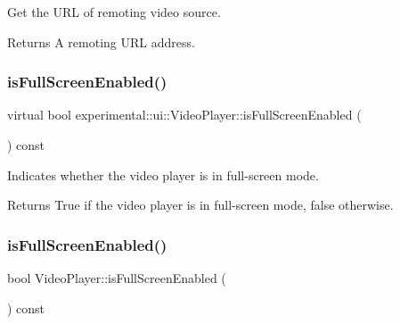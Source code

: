Get the U\+RL of remoting video source. 

\begin{DoxyReturn}{Returns}
A remoting U\+RL address. 
\end{DoxyReturn}
\mbox{\label{classexperimental_1_1ui_1_1VideoPlayer_a466c25180bccd97a4e96708c94f6d1aa}} 
\subsubsection{\texorpdfstring{is\+Full\+Screen\+Enabled()}{isFullScreenEnabled()}\hspace{0.1cm}{\footnotesize\ttfamily [1/2]}}
{\footnotesize\ttfamily virtual bool experimental\+::ui\+::\+Video\+Player\+::is\+Full\+Screen\+Enabled (\begin{DoxyParamCaption}{ }\end{DoxyParamCaption}) const\hspace{0.3cm}{\ttfamily [virtual]}}

Indicates whether the video player is in full-\/screen mode.

\begin{DoxyReturn}{Returns}
True if the video player is in full-\/screen mode, false otherwise. 
\end{DoxyReturn}
\mbox{\label{classexperimental_1_1ui_1_1VideoPlayer_ab2381455eeb422dc2872dc4bd7613e70}} 
\subsubsection{\texorpdfstring{is\+Full\+Screen\+Enabled()}{isFullScreenEnabled()}\hspace{0.1cm}{\footnotesize\ttfamily [2/2]}}
{\footnotesize\ttfamily bool Video\+Player\+::is\+Full\+Screen\+Enabled (\begin{DoxyParamCaption}{ }\end{DoxyParamCaption}) const\hspace{0.3cm}{\ttfamily [virtual]}}

